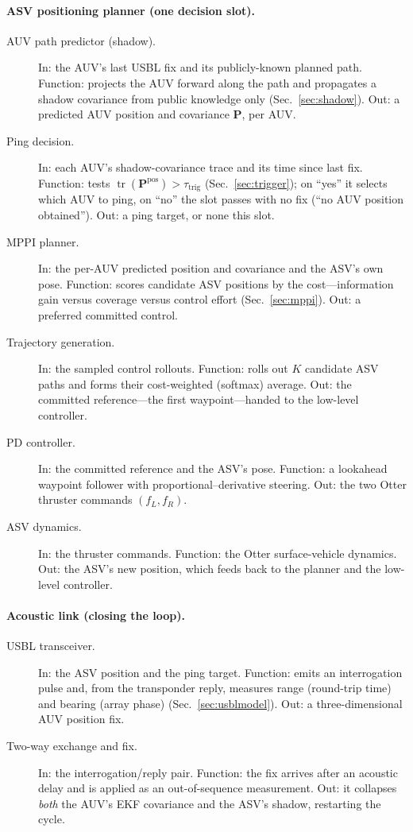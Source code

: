 \documentclass[12pt,a4paper,oneside]{book}
\newcommand{\secref}[1]{Sec.~\ref{#1}}
\begin{document}
\paragraph{ASV positioning planner (one decision slot).}
\begin{description}
\item[AUV path predictor (shadow).] In: the AUV's last USBL fix and its publicly-known planned path.
Function: projects the AUV forward along the path and propagates a shadow covariance from public knowledge
only (\secref{sec:shadow}). Out: a predicted AUV position and covariance $\mathbf{P}$, per AUV.
\item[Ping decision.] In: each AUV's shadow-covariance trace and its time since last fix. Function: tests
$\operatorname{tr}(\mathbf{P}^{\text{pos}})>\tau_{\text{trig}}$ (\secref{sec:trigger}); on ``yes'' it selects
which AUV to ping, on ``no'' the slot passes with no fix (``no AUV position obtained''). Out: a ping target,
or none this slot.
\item[MPPI planner.] In: the per-AUV predicted position and covariance and the ASV's own pose. Function:
scores candidate ASV positions by the cost---information gain versus coverage versus control effort
(\secref{sec:mppi}). Out: a preferred committed control.
\item[Trajectory generation.] In: the sampled control rollouts. Function: rolls out $K$ candidate ASV paths
and forms their cost-weighted (softmax) average. Out: the committed reference---the first waypoint---handed
to the low-level controller.
\item[PD controller.] In: the committed reference and the ASV's pose. Function: a lookahead waypoint
follower with proportional--derivative steering. Out: the two Otter thruster commands $(f_L,f_R)$.
\item[ASV dynamics.] In: the thruster commands. Function: the Otter surface-vehicle dynamics. Out: the ASV's
new position, which feeds back to the planner and the low-level controller.
\end{description}

\paragraph{Acoustic link (closing the loop).}
\begin{description}
\item[USBL transceiver.] In: the ASV position and the ping target. Function: emits an interrogation pulse
and, from the transponder reply, measures range (round-trip time) and bearing (array phase)
(\secref{sec:usblmodel}). Out: a three-dimensional AUV position fix.
\item[Two-way exchange and fix.] In: the interrogation/reply pair. Function: the fix arrives after an
acoustic delay and is applied as an out-of-sequence measurement. Out: it collapses \emph{both} the AUV's EKF
covariance and the ASV's shadow, restarting the cycle.
\end{description}
\end{document}
